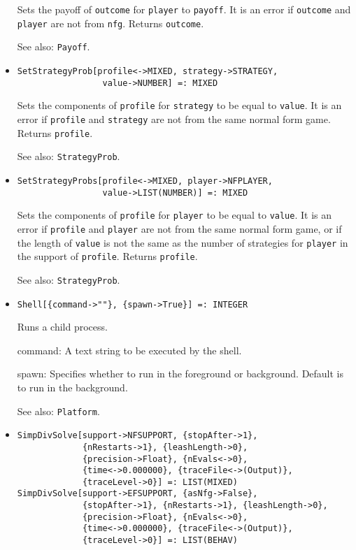 \begin{itemize}
\bd
Sets the payoff of \verb+outcome+ for \verb+player+ to \verb+payoff+.
It is an error if \verb+outcome+ and \verb+player+ are not from \verb+nfg+.
Returns \verb+outcome+.
\item [See also:] \verb+Payoff+.
\ed

\item{} 
\protect \large \begin{verbatim}
SetStrategyProb[profile<->MIXED, strategy->STRATEGY, 
                 value->NUMBER] =: MIXED 
\end{verbatim} \normalsize

\bd
Sets the components of \verb+profile+ for \verb+strategy+ to be equal
to \verb+value+.  It is an error if \verb+profile+ and \verb+strategy+
are not from the same normal form game.  Returns \verb+profile+.
\item [See also:] \verb+StrategyProb+.
\ed

\item{} 
\protect \large \begin{verbatim}
SetStrategyProbs[profile<->MIXED, player->NFPLAYER, 
                 value->LIST(NUMBER)] =: MIXED 
\end{verbatim} \normalsize

\bd
Sets the components of \verb+profile+ for \verb+player+ to be equal
to \verb+value+.  It is an error if \verb+profile+ and \verb+player+
are not from the same normal form game, or if the length of \verb+value+
is not the same as the number of strategies for \verb+player+ in the
support of \verb+profile+.  Returns \verb+profile+.
\item [See also:] \verb+StrategyProb+.
\ed

\item{}
\protect \large \begin{verbatim}
Shell[{command->""}, {spawn->True}] =: INTEGER 
\end{verbatim} \normalsize

\bd
Runs a child process.  
\bd
\item [command:] A text string to be executed by the shell.  
\item [spawn:] Specifies whether to run in the foreground or
background.  Default is to run in the background.  
\ed
\item [See also:] \verb+Platform+.
\ed

\item{}
\protect \large \begin{verbatim}
SimpDivSolve[support->NFSUPPORT, {stopAfter->1}, 
             {nRestarts->1}, {leashLength->0}, 
             {precision->Float}, {nEvals<->0}, 
             {time<->0.000000}, {traceFile<->(Output)}, 
             {traceLevel->0}] =: LIST(MIXED) 
SimpDivSolve[support->EFSUPPORT, {asNfg->False}, 
             {stopAfter->1}, {nRestarts->1}, {leashLength->0}, 
             {precision->Float}, {nEvals<->0}, 
             {time<->0.000000}, {traceFile<->(Output)}, 
             {traceLevel->0}] =: LIST(BEHAV) 
\end{verbatim}\normalsize


\end{itemize}
